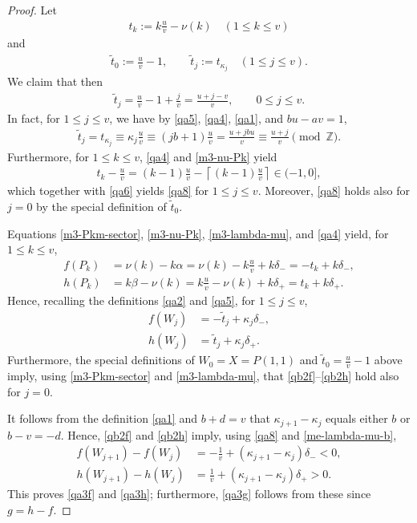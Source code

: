 \documentclass[11pt,reqno,tbtags,a4paper]{amsart}
\numberwithin{equation}{section}
\renewcommand\le{\leq}
\renewcommand\leq{\leqslant}
\theoremstyle{plain}%
\theoremstyle{definition}
\theoremstyle{remark}
\newcommand\lrceil[1]{\left\lceil#1\right\rceil}
\newcommand\bbZ{\mathbb Z}
\newcommand\ga{\alpha}
\newcommand\gb{\beta}
\newcommand\kk{\kappa}
\newcommand\ttt{\widetilde t}
\newcommand\0{{\boldsymbol 0}}
\newcommand\1{{\boldsymbol 1}}
\begin{document}
\begin{proof}
  Let
\begin{align}\label{qa4}
 t_k:=k\frac uv-\nu(k) \quad (1 \le k \le v)
  \end{align}
and
  \begin{align}\label{qa5}
 \widetilde t_0:=\frac uv-1,
 \qquad \widetilde t_j:=t_{\kappa_j}\quad(1\le j\le v).
\end{align}
We claim that then
\begin{align}\label{qa8}
 \widetilde t_j=\frac uv-1+\frac jv
=\frac{u+j-v}{v},
 \qquad 0\le j\le v.
\end{align}
In fact,
for $1\le j\le v$, we have by 
\eqref{qa5}, \eqref{qa4}, \eqref{qa1}, and 
$bu-av=1$, 
\begin{align}\label{qa6}
  \ttt_j = t_{\kk_j} 
\equiv \kk_j \frac{u}{v}
\equiv(jb+1)\frac{u}{v}
=\frac{u+jbu}v
\equiv\frac{u+j}{v}
\pmod\bbZ.
\end{align}
Furthermore, for $1\le k\le v$, \eqref{qa4} and \eqref{m3-nu-Pk} yield
\begin{align}\label{qa7}
  t_k-\frac{u}{v}=(k-1)\frac{u}{v} - \lrceil{(k-1)\frac{u}{v}}
\in(-1,0],
\end{align}
which together with \eqref{qa6} yields \eqref{qa8} 
for $1\le j\le v$. 
Moreover,
\eqref{qa8} holds also for $j=0$ by
the special definition of $\ttt_0$.

Equations \eqref{m3-Pkm-sector}, \eqref{m3-nu-Pk}, 
\eqref{m3-lambda-mu}, and \eqref{qa4}
yield, for $1\le k\le v$, 
\begin{align}\label{qb1f}
  f(P_k)&=\nu(k)-k\ga = \nu(k)-k\frac uv+k\delta_- =-t_k+k\delta_-,
\\\label{qb1h}
 h(P_k)&=k\gb-\nu(k) = k\frac uv-\nu(k) +k\delta_+ = t_k+k\delta_+.
\end{align}
Hence, recalling the definitions \eqref{qa2} and \eqref{qa5},
for $1\le j\le v$,
\begin{align}\label{qb2f}
 f(W_j)&=-\widetilde t_j+\kappa_j\delta_-,
\\\label{qb2h}
 h(W_j)&= \widetilde t_j+\kappa_j\delta_+.
\end{align}
Furthermore, the special definitions of $W_0=X=P(1,1)$ and 
$\ttt_0=\frac uv-1$ above  
imply, using \eqref{m3-Pkm-sector} and \eqref{m3-lambda-mu},
that \eqref{qb2f}--\eqref{qb2h} hold also for $j=0$.

It follows from the definition \eqref{qa1} and $b+d=v$ that
$\kappa_{j+1}-\kappa_j$ equals either $b$ or $b-v=-d$.
Hence, \eqref{qb2f} and \eqref{qb2h} imply,
using \eqref{qa8} and \eqref{me-lambda-mu-b},
\begin{align}
 f(W_{j+1})-f(W_j)
 &=-\frac1v+(\kappa_{j+1}-\kappa_j)\delta_-<0,
 \label{m3-f-W-diff}\\
 h(W_{j+1})-h(W_j)
 &= \frac1v+(\kappa_{j+1}-\kappa_j)\delta_+>0.
 \label{m3-h-W-diff}
\end{align}
This proves \eqref{qa3f} and \eqref{qa3h}; 
furthermore, \eqref{qa3g} follows from these since $g=h-f$.
\end{proof}
\end{document}
